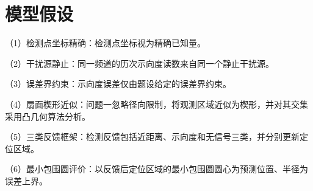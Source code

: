 \section{模型假设}

（1）检测点坐标精确：检测点坐标视为精确已知量。

（2）干扰源静止：同一频道的历次示向度读数来自同一个静止干扰源。

（3）误差界约束：示向度误差仅由题设给定的误差界约束。

（4）扇面楔形近似：问题一忽略径向限制，将观测区域近似为楔形，并对其交集采用凸几何算法分析。

（5）三类反馈框架：检测反馈包括近距离、示向度和无信号三类，并分别更新定位区域。

（6）最小包围圆评价：以反馈后定位区域的最小包围圆圆心为预测位置、半径为误差上界。
